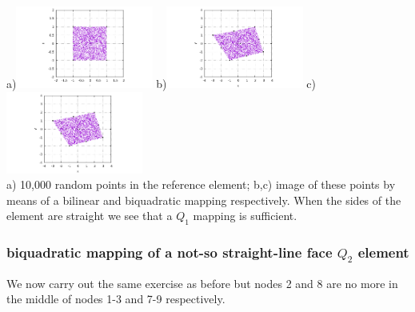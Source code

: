 \begin{center}
a)\includegraphics[width=4.5cm]{images/mappings/biquadratic/rs.pdf}
b)\includegraphics[width=4.5cm]{images/mappings/biquadratic/xyQ1.pdf}
c)\includegraphics[width=4.5cm]{images/mappings/biquadratic/xyQ2.pdf}\\
{\captionfont a) 10,000 random points in the reference element; b,c) image of these points
by means of a bilinear and biquadratic mapping respectively. When the sides of the element
are straight we see that a $Q_1$ mapping is sufficient.}
\end{center}

\subsubsection{biquadratic mapping of a not-so straight-line face $Q_2$ element }

We now carry out the same exercise as before but nodes 2 and 8 are no more 
in the middle of nodes 1-3 and 7-9 respectively.

